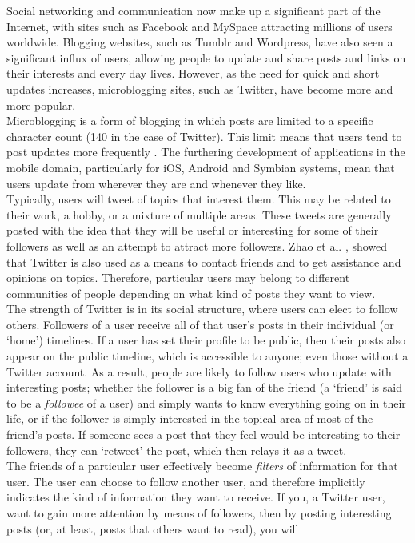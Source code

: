 Social networking and communication now make up a significant part of the Internet, with sites such as Facebook and MySpace attracting millions of users worldwide. Blogging websites, such as Tumblr and Wordpress, have also seen a significant influx of users, allowing people to update and share posts and links on their interests and every day lives. However, as the need for quick and short updates increases, microblogging sites, such as Twitter, have become more and more popular.\\
Microblogging is a form of blogging in which posts are limited to a specific character count (140 in the case of Twitter). This limit means that users tend to post updates more frequently \cite{zhao09}. The furthering development of applications in the mobile domain, particularly for iOS, Android and Symbian systems, mean that users update from wherever they are and whenever they like.\\
Typically, users will tweet of topics that interest them. This may be related to their work, a hobby, or a mixture of multiple areas. These tweets are generally posted with the idea that they will be useful or interesting for some of their followers as well as an attempt to attract more followers. Zhao et al. \cite{zhao09}, showed that Twitter is also used as a means to contact friends and to get assistance and opinions on topics. Therefore, particular users may belong to different communities of people depending on what kind of posts they want to view.\\
The strength of Twitter is in its social structure, where users can elect to follow others. Followers of a user receive all of that user's posts in their individual (or `home') timelines. If a user has set their profile to be public, then their posts also appear on the public timeline, which is accessible to anyone; even those without a Twitter account. As a result, people are likely to follow users who update with interesting posts; whether the follower is a big fan of the friend (a `friend' is said to be a \textit{followee} of a user) and simply wants to know everything going on in their life, or if the follower is simply interested in the topical area of most of the friend's posts. If someone sees a post that they feel would be interesting to their followers, they can `retweet' the post, which then relays it as a tweet.\\
The friends of a particular user effectively become \textit{filters} of information for that user. The user can choose to follow another user, and therefore implicitly indicates the kind of information they want to receive. If you, a Twitter user, want to gain more attention by means of followers, then by posting interesting posts (or, at least, posts that others want to read), you will 
